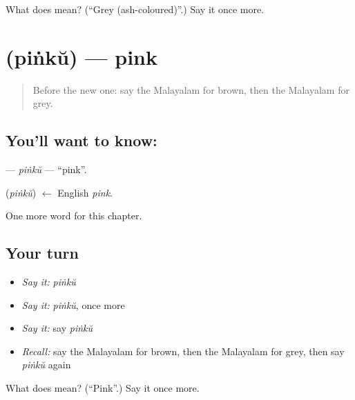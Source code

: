 \begin{tcolorbox}[breakable,colback=teal!4,colframe=teal!35!black,title={Before you move on}]
What does  mean? (\textquotedblleft{}Grey (ash-coloured)\textquotedblright{}.) Say it once more.
\end{tcolorbox}
\section[\texorpdfstring{\ml{പിങ്ക്} (piṅkŭ)}{പിങ്ക് (piṅkŭ)}]{ (piṅkŭ) — pink}

\label{lesson:ML-C245-pinku}



\begin{quote}
Before the new one: say the Malayalam for brown, then the Malayalam for grey.
\end{quote}

\subsection*{You'll want to know: }
\textbf{} — \emph{piṅkŭ} — \textquotedblleft{}pink\textquotedblright{}.

\begin{cousinweb}
\textbf{} (\emph{piṅkŭ}) $\leftarrow$ English \emph{pink}.
\end{cousinweb}

\begin{grammarlens}[title={What you've built}]
One more word for this chapter.
\end{grammarlens}

\subsection*{Your turn}
\begin{itemize}
\raggedright
  \item \emph{Say it:} \emph{piṅkŭ}
  \item \emph{Say it:} \emph{piṅkŭ}, once more
  \item \emph{Say it:} say \emph{piṅkŭ}
  \item \emph{Recall:} say the Malayalam for brown, then the Malayalam for grey, then say \emph{piṅkŭ} again
\end{itemize}

\begin{tcolorbox}[breakable,colback=teal!4,colframe=teal!35!black,title={Before you move on}]
What does  mean? (\textquotedblleft{}Pink\textquotedblright{}.) Say it once more.
\end{tcolorbox}
